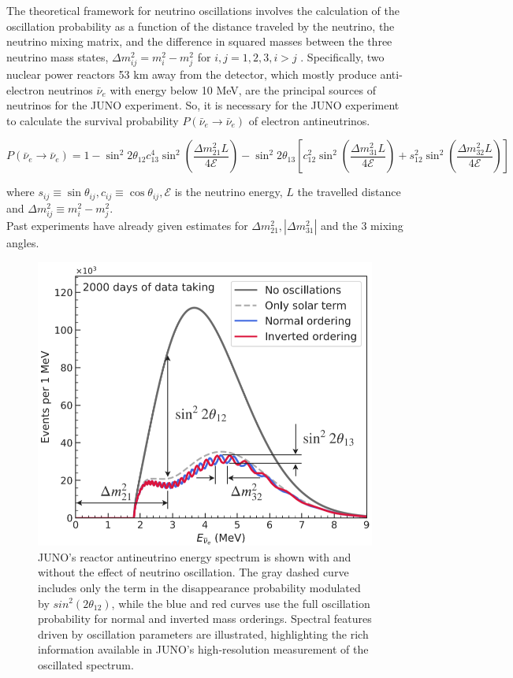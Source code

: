 The theoretical framework for neutrino oscillations involves the calculation of the oscillation probability as a function of the distance traveled by the neutrino, the neutrino mixing matrix, and the difference in squared masses between the three neutrino mass states, $\Delta m_{ij}^2 = m^2_i - m^2_j$ for $i,j = 1,2,3, i>j$ . Specifically, two nuclear power reactors 53 $\unit{\kilo\meter}$ away from the detector, which mostly produce anti-electron neutrinos $\bar{\nu}_e$ with energy below 10 MeV, are the principal sources of neutrinos for the JUNO experiment. So, it is necessary for the JUNO experiment to calculate the survival probability $P\left(\bar{\nu}_e \rightarrow \bar{\nu}_e\right)$ of electron antineutrinos.

\begin{equation*}
	P\left(\bar{\nu}_e \rightarrow \bar{\nu}_e\right)=1-\sin ^2 2 \theta_{12} c_{13}^4 \sin ^2\left(\frac{\Delta m_{21}^2 L}{4 \mathcal{E}}\right)-\sin ^2 2 \theta_{13}\left[c_{12}^2 \sin ^2\left(\frac{\Delta m_{31}^2 L}{4 \mathcal{E}}\right)+s_{12}^2 \sin ^2\left(\frac{\Delta m_{32}^2 L}{4 \mathcal{E}}\right)\right]
\end{equation*}

where $s_{i j} \equiv \sin \theta_{i j}, c_{i j} \equiv \cos \theta_{i j}, \mathcal{E}$ is the neutrino energy, $L$ the travelled distance and $\Delta m_{i j}^2 \equiv m_i^2-m_j^2$. \\
Past experiments have already given estimates for  $\Delta m_{21}^2,\left|\Delta m_{31}^2\right|$ and the  3 mixing angles.


\begin{figure}[h]
	\centering
	\includegraphics[width=0.3\linewidth]{Images/antineutino_to_antineutrino_probability_plot}
	\caption{JUNO's reactor antineutrino energy spectrum is shown with and without the effect of neutrino oscillation. The gray dashed curve includes only the term in the disappearance probability modulated by $sin^2(2\theta_{12})$, while the blue and red curves use the full oscillation probability for normal and inverted mass orderings. Spectral features driven by oscillation parameters are illustrated, highlighting the rich information available in JUNO's high-resolution measurement of the oscillated spectrum.}
	\label{fig:antineutinotoantineutrinoprobabilityplot}
\end{figure}


